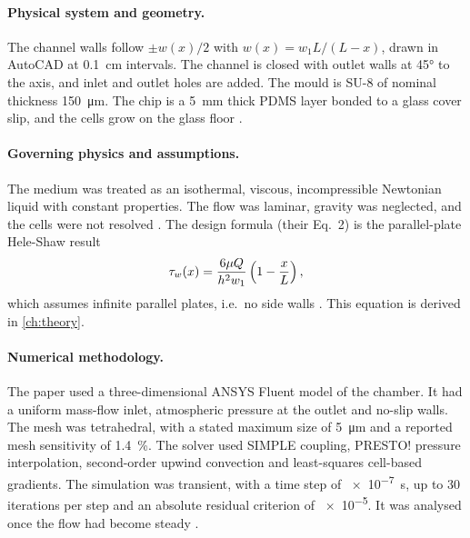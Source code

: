 \paragraph{Physical system and geometry.} The channel walls follow $\pm w(x)/2$ with $w(x)=w_1L/(L-x)$, drawn in AutoCAD at \SI{0.1}{cm} intervals. The channel is closed with outlet walls at \ang{45} to the axis, and inlet and outlet holes are added. The mould is SU-8 of nominal thickness \SI{150}{\micro\metre}. The chip is a \SI{5}{mm} thick PDMS layer bonded to a glass cover slip, and the cells grow on the glass floor \tagP.

\paragraph{Governing physics and assumptions.} The medium was treated as an isothermal, viscous, incompressible Newtonian liquid with constant properties. The flow was laminar, gravity was neglected, and the cells were not resolved \tagP. The design formula (their Eq.~2) is the parallel-plate Hele-Shaw result
\begin{equation}
\tau_{w}(x)=\frac{6\mu Q}{h^2w_1}\left(1-\frac{x}{L}\right),
\label{eq:lit_eq2}
\end{equation}
which assumes infinite parallel plates, i.e.\ no side walls \tagP. This equation is derived in \cref{ch:theory}.

\paragraph{Numerical methodology.} The paper used a three-dimensional ANSYS Fluent model of the chamber. It had a uniform mass-flow inlet, atmospheric pressure at the outlet and no-slip walls. The mesh was tetrahedral, with a stated maximum size of \SI{5}{\micro\metre} and a reported mesh sensitivity of \SI{1.4}{\percent}. The solver used SIMPLE coupling, PRESTO! pressure interpolation, second-order upwind convection and least-squares cell-based gradients. The simulation was transient, with a time step of \SI{e-7}{s}, up to 30 iterations per step and an absolute residual criterion of \num{e-5}. It was analysed once the flow had become steady \tagP.


